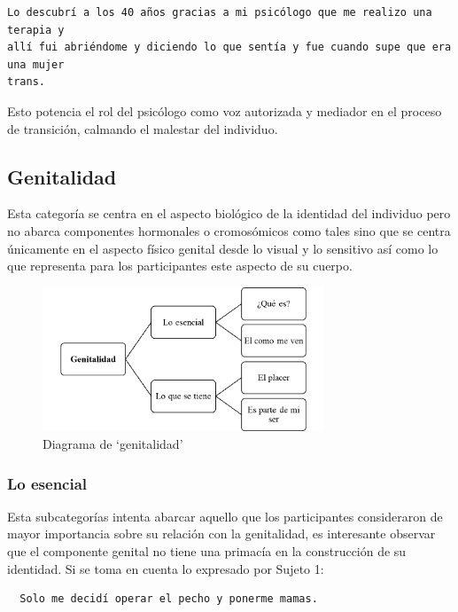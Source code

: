 \begin{verbatim}
Lo descubrí a los 40 años gracias a mi psicólogo que me realizo una terapia y
allí fui abriéndome y diciendo lo que sentía y fue cuando supe que era una mujer
trans.
\end{verbatim}

Esto potencia el rol del psicólogo como voz autorizada y mediador en el proceso
de transición, calmando el malestar del individuo.

\subsection{Genitalidad}

Esta categoría se centra en el aspecto biológico de la identidad del individuo
pero no abarca componentes hormonales o cromosómicos como tales sino que se
centra únicamente en el aspecto físico genital desde lo visual y lo sensitivo
así como lo que representa para los participantes este aspecto de su cuerpo.

\begin{figure}
    \centering
    \includegraphics[width=0.75\textwidth]{genitalidad}
    \caption{Diagrama de ‘genitalidad’}\label{fig:genitalidad}
\end{figure}

\subsubsection{Lo esencial}

Esta subcategorías intenta abarcar aquello que los participantes consideraron de
mayor importancia sobre su relación con la genitalidad, es interesante observar
que el componente genital no tiene una primacía en la construcción de su
identidad. Si se toma en cuenta lo expresado por Sujeto 1:

\begin{verbatim}
  Solo me decidí operar el pecho y ponerme mamas.
\end{verbatim}

